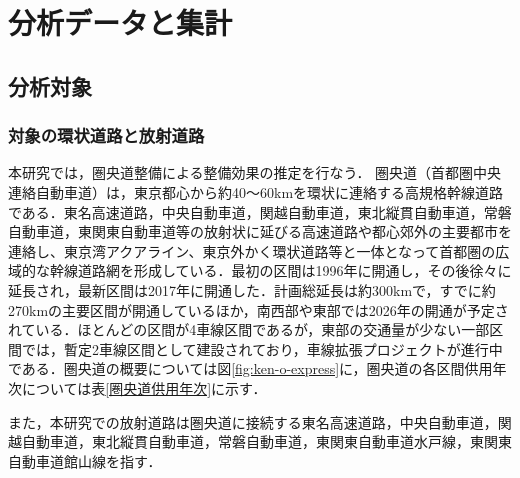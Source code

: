 \chapter{分析データと集計}

\section{分析対象}
\subsection{対象の環状道路と放射道路}
本研究では，圏央道整備による整備効果の推定を行なう．
圏央道（首都圏中央連絡自動車道）は，東京都心から約40〜60kmを環状に連絡する高規格幹線道路である．東名高速道路，中央自動車道，関越自動車道，東北縦貫自動車道，常磐自動車道，東関東自動車道等の放射状に延びる高速道路や都心郊外の主要都市を連絡し、東京湾アクアライン、東京外かく環状道路等と一体となって首都圏の広域的な幹線道路網を形成している\cite{kokudo2024}．最初の区間は1996年に開通し，その後徐々に延長され，最新区間は2017年に開通した．計画総延長は約300kmで，すでに約270kmの主要区間が開通しているほか，南西部や東部では2026年の開通が予定されている．ほとんどの区間が4車線区間であるが，東部の交通量が少ない一部区間では，暫定2車線区間として建設されており，車線拡張プロジェクトが進行中である．圏央道の概要については図\ref{fig:ken-o-express}に，圏央道の各区間供用年次については表\ref{圏央道供用年次}に示す．

また，本研究での放射道路は圏央道に接続する東名高速道路，中央自動車道，関越自動車道，東北縦貫自動車道，常磐自動車道，東関東自動車道水戸線，東関東自動車道館山線を指す．

